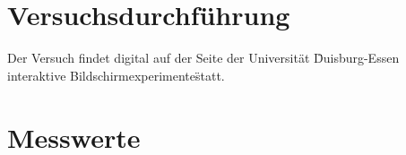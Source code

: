 


\section{Versuchsdurchführung}
Der Versuch findet digital auf der Seite der Universität \"Duisburg-Essen interaktive Bildschirmexperimente\" statt.
\section{Messwerte}

\label{sec:Durchführung}



